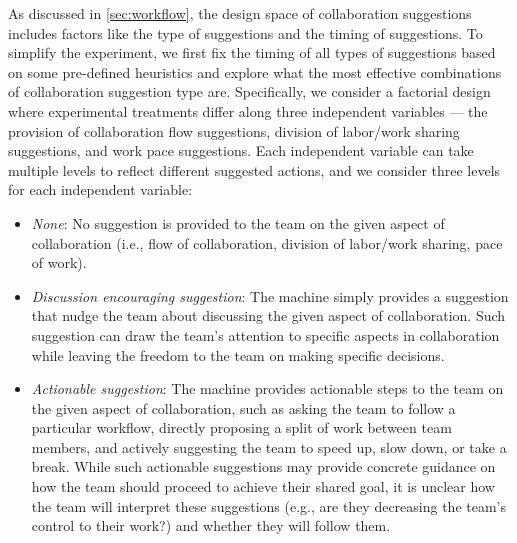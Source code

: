 As discussed in \ref{sec:workflow}, the design space of collaboration suggestions includes factors like the type of suggestions
and the timing of suggestions. To simplify the experiment, we first fix the timing of all types of suggestions based on some pre-defined heuristics and explore what the most effective combinations of collaboration suggestion type 
are. Specifically, we consider a factorial design where experimental treatments differ along three independent variables --- the provision of collaboration flow suggestions, 
division of labor/work sharing suggestions, and 
work pace suggestions. 
Each independent variable can take multiple levels to reflect different %
suggested actions, and we 
consider three levels for each independent variable:
\begin{itemize}[leftmargin=*]
\item {\em None}: No suggestion is provided to the team on the given aspect of collaboration (i.e., flow of collaboration, division of labor/work sharing, pace of work).
\item {\em Discussion encouraging suggestion}: The machine simply provides a suggestion that nudge the team about discussing the given aspect of collaboration. %
Such suggestion can draw the team's attention to specific aspects in collaboration while leaving the freedom to the team on making specific decisions.
\item {\em Actionable suggestion}: The machine provides actionable steps to the team on the given aspect of collaboration, such as asking the team to follow a particular workflow, directly proposing a split of work between team members, and actively suggesting the team to speed up, slow down, or take a break. While such actionable suggestions may provide concrete guidance on how the team should proceed to achieve their shared goal, it is unclear how the team will interpret these suggestions (e.g., are they decreasing the team's control to their work?) and whether they will follow them. 
\end{itemize}


